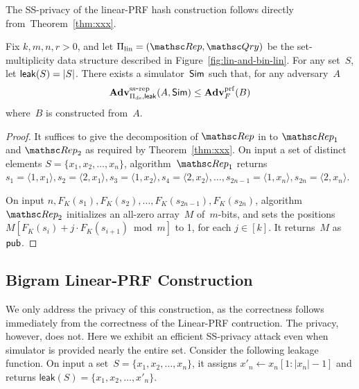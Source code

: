 The SS-privacy of the linear-PRF hash construction follows directly from~Theorem~\ref{thm:xxx}.
\begin{theorem}\label{thm:lin-privacy}
Fix $k,m,n,r>0$, and let $\setprim_{\mathrm{lin}}= (\Rep, \Qry)$ be the set-multiplicity data structure described in Figure~\ref{fig:lin-and-bin-lin}. For any set~$S$, let ${\sf leak}(S)=|S|$.  There exists a simulator~${\sf Sim}$ such that, for any adversary~$A$
\[
\mathrm{\mathbf{Adv}}^{\mathrm{ss\mbox{-}rep}}_{\Pi_{\mathrm{ds}},{\sf leak}}(A,{\sf Sim}) \leq  \mathbf{Adv}^{\mathrm{prf}}_{F}(B)
\]
where~$B$ is constructed from~$A$.  
\end{theorem}
\begin{proof}
It suffices to give the decomposition of $\Rep$ in to $\Rep_1$ and $\Rep_2$ as required by Theorem~\ref{thm:xxx}.
On input a set of distinct elements
$S=\{x_1,x_2,\ldots,x_n\}$, algorithm~$\Rep_1$ returns $s_1=\langle 1,x_1 \rangle, s_2=\langle 2,x_1 \rangle, s_3 = \langle 1,x_2\rangle, s_4=\langle 2,x_2 \rangle,\ldots,s_{2n-1}=\langle 1,x_n \rangle, s_{2n}=\langle 2,x_n \rangle$.

On input $n,F_K(s_1),F_K(s_2),\ldots,F_K(s_{2n-1}) , F_K(s_{2n})$, algorithm $\Rep_2$ initializes an all-zero array~$M$ of~$m$-bits, and sets the positions $M[F_K(s_i)+j\cdot F_K(s_{i+1})\bmod m]$ to 1, for each $j \in [k]$.  It returns~$M$ as ${\sf pub}$.
\end{proof}


\subsection{Bigram Linear-PRF Construction}
We only address the privacy of this construction, as the correctness follows immediately from the correctness of the Linear-PRF contruction.  The privacy, however, does not.  Here we exhibit an efficient SS-privacy attack even when simulator is provided nearly the entire set.  Consider the following leakage function.  On input a set~$S=\{x_1,x_2,\ldots,x_n\}$, it assigns $x'_n \gets x_n[1:|x_n|-1]$ and returns $\mathsf{leak}(S)=\{x_1,x_2,\ldots,x'_n\}$.  

